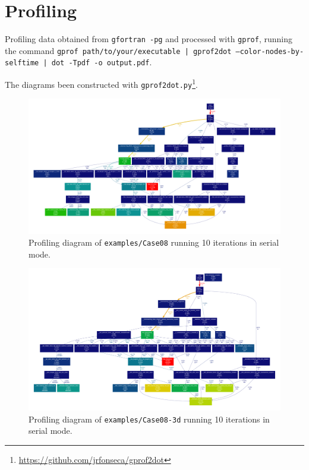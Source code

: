 \chapter{Profiling}\label{sec:profiling}

Profiling data obtained from \texttt{gfortran -pg} and processed with \texttt{gprof}, running the command \texttt{gprof path/to/your/executable | gprof2dot --color-nodes-by-selftime | dot -Tpdf -o output.pdf}.

The diagrams been constructed with \texttt{gprof2dot.py}\footnote{\url{https://github.com/jrfonseca/gprof2dot}}.

\begin{figure}[!h]
  \centering
  \includegraphics[clip,width=\textwidth]{fig-profiling08.pdf}
  \caption{Profiling diagram of \texttt{examples/Case08} running 10 iterations in serial mode.}
\end{figure}

\newpage

\begin{figure}[!h]
  \centering
  \includegraphics[clip,width=\textwidth]{fig-profiling08-3d.pdf}
  \caption{Profiling diagram of \texttt{examples/Case08-3d} running 10 iterations in serial mode.}
\end{figure}

